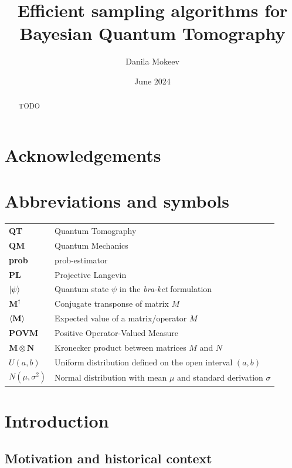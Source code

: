 \documentclass[12pt]{memoir}
\title{Efficient sampling algorithms for Bayesian Quantum Tomography}
\author{Danila Mokeev}
\date{June 2024}
\newcommand{\mb}{\mathbf}
\newcommand{\tb}{\textbf}
\newcommand{\ti}{\textit}
\begin{document}

\maketitle

\begin{abstract}
    TODO
\end{abstract}

\newpage

\chapter*{Acknowledgements}

\newpage

\tableofcontents*

\newpage

\chapter*{Abbreviations and symbols}
\begin{tabular}{ll}
\tb{QT} &  Quantum Tomography \\
\tb{QM} & Quantum Mechanics\\
\tb{prob} & prob-estimator\\
\tb{PL}& Projective Langevin  \\
$\ket{{\psi}}$ & Quantum state $\psi$ in the \ti{bra-ket} formulation\\
$\mb{M^\dagger}$ & Conjugate transponse of matrix $M$\\
$\braket{\mb M}$ & Expected value of a matrix/operator $M$\\
\tb {POVM} & Positive Operator-Valued Measure\\
$\mb{M\otimes N}$ & Kronecker product between matrices $M$ and $N$\\
${U}(a,b)$ & Uniform distribution defined on the open interval $(a,b)$\\
$N(\mu, \sigma^2)$ & Normal distribution with mean $\mu$ and standard derivation $\sigma$
\end{tabular}

\chapter{Introduction}

\section{Motivation and historical context}
\end{document}
